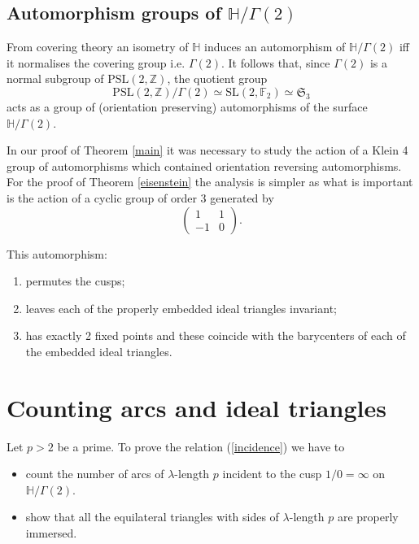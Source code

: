 \documentclass[12pt]{amsart}
\theoremstyle{plain}
\theoremstyle{definition}
\def\HH{\mathbb{H}}
\def\xx{\HH/g2}
\def\ZZ{\mathbb{Z}}
\def\sl2{\mathrm{PSL}(2, \ZZ)}
\def\g2{\Gamma(2)}
\def\xx{\HH/\g2}
\begin{document}
\subsection{Automorphism groups of $\xx$}
From covering theory an isometry  of $\HH$ 
induces an automorphism of $\xx$ iff it normalises the covering group
i.e. $\g2$.
It follows that,
since $\g2$ is a normal subgroup of $\sl2$,
 the quotient group
 $$ \sl2/\g2 \simeq \mathrm{SL}(2, \mathbb{F}_2) \simeq \mathfrak{S}_3$$
acts as a group of (orientation preserving) automorphisms of the surface $\xx$.



In our proof of Theorem \ref{main}
it was necessary to study the action of
a Klein 4 group of automorphisms
which contained orientation reversing automorphisms.
For the proof of Theorem \ref{eisenstein}
the analysis is simpler as what is important
is  the action of a
cyclic group of order 3
generated by
$$ \begin{pmatrix}
1 & 1 \\
-1 & 0
\end{pmatrix} .$$

This automorphism:
\begin{enumerate}
\item permutes the cusps;
\item leaves each of the properly embedded  ideal triangles invariant;
\item has exactly 2 fixed points and these coincide with the
	barycenters of each of the embedded ideal triangles.
\end{enumerate}




\section{Counting arcs and ideal triangles}
\label{counting arcs etc}

Let $p> 2$ be a prime. To prove the relation (\ref{incidence})
we have to  
\begin{itemize}
\item count the number 
of arcs of $\lambda$-length $p$
incident to the cusp $1/0 = \infty$ on $\xx$.
\item 
show that all the equilateral triangles with sides of $\lambda$-length $p$ are properly immersed.
\end{itemize}
\end{document}
